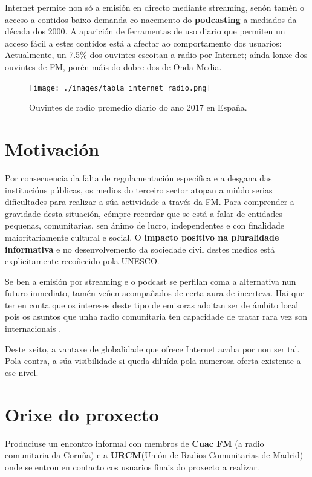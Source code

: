 Internet permite non só a emisión en directo mediante streaming, senón tamén o acceso a contidos baixo demanda co nacemento do \textbf{podcasting} a mediados da década dos 2000\cite{guardian}. A aparición de ferramentas de uso diario que permiten un acceso fácil a estes contidos está a afectar ao comportamento dos usuarios: Actualmente, un 7.5\% dos ouvintes escoitan a radio por Internet; aínda lonxe dos ouvintes de FM, porén máis do dobre dos de Onda Media\cite{EGM}.

\begin{figure}[H]
	\centering
	\texttt{[image: ./images/tabla\_internet\_radio.png]}
  	\caption{Ouvintes de radio promedio diario do ano 2017 en España.}
	\label{fig:table_egm}
\end{figure}

\section{Motivación}

Por consecuencia da falta de regulamentación específica e a desgana das institucións públicas, os medios do  terceiro sector atopan a miúdo serias dificultades para realizar a súa actividade a través da FM. Para comprender a gravidade desta situación, cómpre recordar que se está a falar de entidades pequenas, comunitarias, sen ánimo de lucro, independentes e con finalidade maioritariamente cultural e social\cite{fesp}. O \textbf{impacto positivo na pluralidade informativa} e no desenvolvemento da sociedade civil destes medios está explicitamente recoñecido pola UNESCO\cite{unesco}. 

Se ben a emisión por streaming e o podcast se perfilan coma a alternativa nun futuro inmediato, tamén veñen acompañados de certa aura de incerteza. Hai que ter en conta que os intereses deste tipo de emisoras adoitan ser de ámbito local pois os asuntos que unha radio comunitaria ten capacidade de tratar rara vez son internacionais . 

Deste xeito, a vantaxe de globalidade que ofrece Internet acaba por non ser tal. Pola contra, a súa visibilidade si queda diluída pola numerosa oferta existente a ese nivel.


\section{Orixe do proxecto}

Produciuse un encontro informal con membros de \textbf{Cuac FM} (a radio comunitaria da Coruña) e a \textbf{URCM}(Unión de Radios Comunitarias de Madrid) onde se entrou en contacto cos usuarios finais do proxecto a realizar. 

